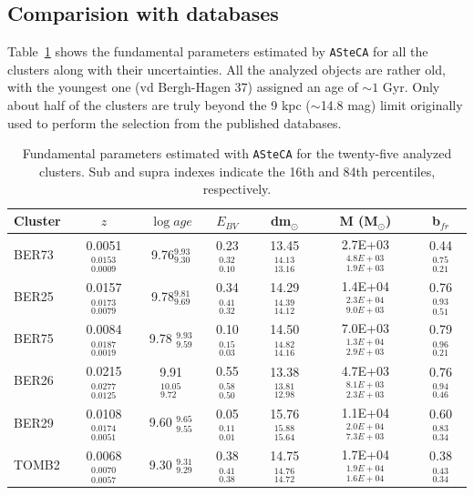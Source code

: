\documentclass[draft]{aa}
\begin{document}
  \subsection{Comparision with databases}
  \label{ssec:databases}

  Table~\ref{tab:results} shows the fundamental parameters estimated by
  \texttt{ASteCA} for all the clusters along with their uncertainties. All the
  analyzed objects are rather old, with the youngest one (vd Bergh-Hagen 37)
  assigned an age of $\sim1$ Gyr. Only about half of the clusters are truly
  beyond the 9 kpc ($\sim$14.8 mag) limit originally
  used to perform the selection from the published databases.\\

  \begin{table}
  \caption{Fundamental parameters estimated with \texttt{ASteCA} for the
  twenty-five analyzed clusters. Sub and supra indexes indicate the 16th
  and 84th percentiles, respectively.}
  \label{tab:results}
  \centering
  \begin{tabular}{lcccccc}
  \hline\hline
  Cluster & $z$ & $\log{age}$ & $E_{BV}$ & dm$_{\odot}$ & M (M$_{\odot}$) & b$_
  {fr}$ \\
  \hline %
  BER73 & 0.0051$_{0.0009}^{0.0153}$ & 9.76$_{9.30}^{9.93}$ & 0.23$_{0.10}^{0.32}$ &
  13.45$_{13.16}^{14.13}$ & 2.7E+03$_{1.9E+03}^{4.8E+03}$ & 0.44$_{0.21}^{0.75}$\\[.2cm]
  BER25 &  0.0157$_{0.0079}^{0.0173}$ & 9.78$_{9.69}^{9.81}$ & 0.34$_{0.32}^{0.41}$ &
  14.29$_{14.12}^{14.39}$ & 1.4E+04$_{9.0E+03}^{2.3E+04}$ & 0.76$_{0.51}^{0.93}$\\[.2cm]
  BER75 & 0.0084$_{0.0019}^{0.0187}$ & 9.78 $_{9.59}^{9.93 }$ & 0.10$_{0.03}^{0.15}$ &
  14.50$_{14.16}^{14.82}$ & 7.0E+03$_{2.9E+03}^{1.3E+04}$ & 0.79$_{0.21}^{0.96}$\\[.2cm]
  BER26 & 0.0215$_{0.0125}^{0.0277}$ & 9.91 $_{9.72}^{10.05}$ & 0.55$_{0.50}^{0.58}$ &
  13.38$_{12.98}^{13.81}$ & 4.7E+03$_{2.3E+03}^{8.1E+03}$ & 0.76$_{0.46}^{0.94}$\\[.2cm]
  BER29 & 0.0108$_{0.0051}^{0.0174}$ & 9.60 $_{9.55}^{9.65 }$ & 0.05$_{0.01}^{0.11}$ &
  15.76$_{15.64}^{15.88}$ & 1.1E+04$_{7.3E+03}^{2.0E+04}$ & 0.60$_{0.34}^{0.83}$\\[.2cm]
  TOMB2 & 0.0068$_{0.0057}^{0.0070}$ & 9.30 $_{9.29}^{9.31 }$ & 0.38$_{0.38}^{0.41}$ &
  14.75$_{14.72}^{14.76}$ & 1.7E+04$_{1.6E+04}^{1.9E+04}$ & 0.38$_{0.34}^{0.43}$\\[.2cm]

\end{tabular}
\end{table}
\end{document}
